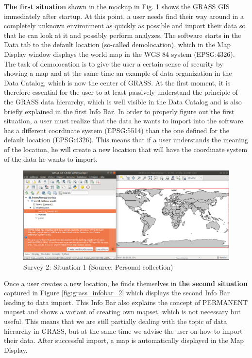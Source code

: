 \documentclass[a4paper,10pt,twoside]{article}
\begin{document}
\textbf{The first situation} shown in the mockup in Fig. \ref{fig:grass_infobar_1} shows the GRASS GIS immediately after startup. At this point, a user needs find their way around in a completely unknown environment as quickly as possible and import their data so that he can look at it and possibly perform analyzes. The software starts in the Data tab to the default location (so-called demolocation), which in the Map Display window displays the world map in the WGS 84 system (EPSG:4326). The task of demolocation is to give the user a certain sense of security by showing a map and at the same time an example of data organization in the Data Catalog, which is now the center of GRASS. At the first moment, it is therefore essential for the user to at least passively understand the principle of the GRASS data hierarchy, which is well visible in the Data Catalog and is also briefly explained in the first Info Bar. In order to properly figure out the first situation, a user must realize that the data he wants to import into the software has a different coordinate system (EPSG:5514) than the one defined for the default location (EPSG:4326). This means that if a user understands the meaning of the location, he will create a new location that will have the coordinate system of the data he wants to import.

\vspace{0.3cm}
\begin{figure}[hbt!] 
\begin{center}
\includegraphics[width=17cm]{../pictures/grass_infobar_1.png} 
\caption[Survey 2: Situation 1]{Survey 2: Situation 1 (Source: Personal collection)}
\label{fig:grass_infobar_1}
\end{center}
\end{figure}

\noindent Once a user creates a new location, he finds themselves in \textbf{the second situation} captured in Figure \ref{fig:grass_infobar_2} which displays the second Info Bar leading to data import. This Info Bar also explains the concept of PERMANENT mapset and shows a variant of creating own mapset, which is not necessary but useful. This means that we are still partially dealing with the topic of data hierarchy in GRASS, but at the same time we advise the user on how to import their data. After successful import, a map is automatically displayed in the Map Display.
\end{document}
